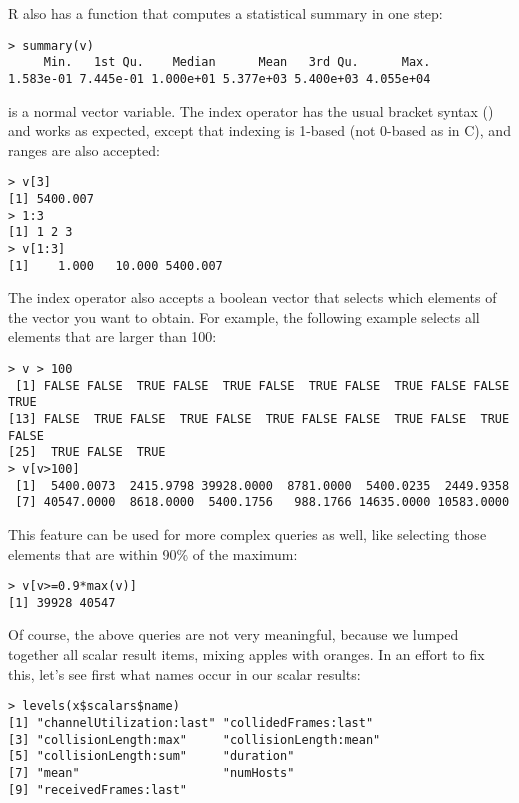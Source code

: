 R also has a function that computes a statistical summary in one step:

\begin{verbatim}
> summary(v)
     Min.   1st Qu.    Median      Mean   3rd Qu.      Max.
1.583e-01 7.445e-01 1.000e+01 5.377e+03 5.400e+03 4.055e+04
\end{verbatim}

 is a normal vector variable. The index operator has the usual bracket
syntax (\ttt{[]}) and works as expected, except that indexing is 1-based
(not 0-based as in C), and ranges are also accepted:

\begin{verbatim}
> v[3]
[1] 5400.007
> 1:3
[1] 1 2 3
> v[1:3]
[1]    1.000   10.000 5400.007
\end{verbatim}

The index operator also accepts a boolean vector that selects which elements
of the vector you want to obtain. For example, the following example selects
all elements that are larger than 100:

\begin{verbatim}
> v > 100
 [1] FALSE FALSE  TRUE FALSE  TRUE FALSE  TRUE FALSE  TRUE FALSE FALSE  TRUE
[13] FALSE  TRUE FALSE  TRUE FALSE  TRUE FALSE FALSE  TRUE FALSE  TRUE FALSE
[25]  TRUE FALSE  TRUE
> v[v>100]
 [1]  5400.0073  2415.9798 39928.0000  8781.0000  5400.0235  2449.9358
 [7] 40547.0000  8618.0000  5400.1756   988.1766 14635.0000 10583.0000
\end{verbatim}

This feature can be used for more complex queries as well, like selecting those
elements that are within 90\% of the maximum:

\begin{verbatim}
> v[v>=0.9*max(v)]
[1] 39928 40547
\end{verbatim}

Of course, the above queries are not very meaningful, because we lumped together
all scalar result items, mixing apples with oranges. In an effort to fix this,
let's see first what names occur in our scalar results:

\begin{verbatim}
> levels(x$scalars$name)
[1] "channelUtilization:last" "collidedFrames:last"
[3] "collisionLength:max"     "collisionLength:mean"
[5] "collisionLength:sum"     "duration"
[7] "mean"                    "numHosts"
[9] "receivedFrames:last"
\end{verbatim}

